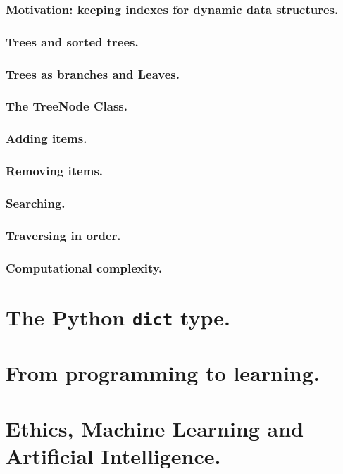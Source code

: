 \documentclass{beamer} %
\begin{document}
\begin{frame}
\frametitle{Motivation: keeping indexes for dynamic data structures.}
\end{frame}

\begin{frame}
\frametitle{Trees and sorted trees.}
\end{frame}

\begin{frame}
\frametitle{Trees as branches and Leaves.}
\end{frame}

\begin{frame}
\frametitle{The TreeNode Class.}
\end{frame}

\begin{frame}
\frametitle{Adding items.}
\end{frame}

\begin{frame}
\frametitle{Removing items.}
\end{frame}

\begin{frame}
\frametitle{Searching.}
\end{frame}

\begin{frame}
\frametitle{Traversing in order.}
\end{frame}

\begin{frame}
\frametitle{Computational complexity.}
\end{frame}

\section{The Python \texttt{dict} type.}

\section{From programming to learning.}

\section{Ethics, Machine Learning and Artificial Intelligence.}



\end{document}
